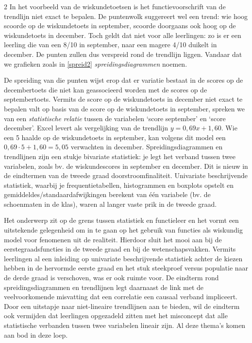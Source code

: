 \begin{multicols}{2}
In het voorbeeld van de wiskundetoetsen is het functievoorschrift van de trendlijn niet exact te bepalen. De puntenwolk suggereert wel een trend: wie hoog scoorde op de wiskundetoets in september, scoorde doorgaans ook hoog op de wiskundetoets in december. Toch geldt dat niet voor alle leerlingen: zo is er een leerling die van een 8/10 in september, naar een magere 4/10 duikelt in december. De punten zullen dus verspreid rond de trendlijn liggen. Vandaar dat we grafieken zoals in \autoref{spreid2} \textit{spreidingsdiagrammen} noemen. 

De spreiding van die punten wijst erop dat er variatie bestaat in de scores op de decembertoets die niet kan geassocieerd worden met de scores op de septembertoets. Vermits de score op de wiskundetoets in december niet exact te bepalen valt op basis van de score op de wiskundetoets in september, spreken we van een \textit{statistische relatie} tussen de variabelen `score september' en `score december'. Excel levert als vergelijking van de trendlijn $y = 0,69x + 1,60$. Wie een 5 haalde op de wiskundetoets in september, kan volgens dit model een $0,69\cdot5+1,60 = 5,05$ verwachten in december.
Spreidingsdiagrammen en trendlijnen zijn een stukje bivariate statistiek: je legt het verband tussen twee variabelen, zoals bv. de wiskundescores in september en december. Dit is nieuw in de eindtermen van de tweede graad doorstroomfinaliteit. Univariate beschrijvende statistiek, waarbij je frequentietabellen, histogrammen en boxplots opstelt en gemiddeldes/standaardafwijkingen berekent van één variabele (bv. de schoenmaten in de klas), waren al langer vaste prik in de tweede graad.

Het onderwerp zit op de grens tussen statistiek en functieleer en het vormt een uitstekende gelegenheid om in te gaan op het gebruik van functies als wiskundig model voor fenomenen uit de realiteit. Hierdoor sluit het mooi aan bij de eerstegraadsfuncties in de tweede graad en bij de wetenschapsvakken. Vermits leerlingen al een inleiding op univariate beschrijvende statistiek achter de kiezen hebben in de hervormde eerste graad en het stuk steekproef versus populatie naar de derde graad is verschoven, was er ook ruimte voor. De eindterm rond spreidingsdiagrammen en trendlijnen legt daarnaast de link met de veelvoorkomende misvatting dat een correlatie een causaal verband impliceert. Door een uitstapje naar niet-lineaire trendlijnen aan te bieden, wil de eindterm ook vermijden dat leerlingen opgezadeld zitten met het misconcept dat alle statistische verbanden tussen twee variabelen lineair zijn. Al deze thema's komen aan bod in deze loep.


\end{multicols}
